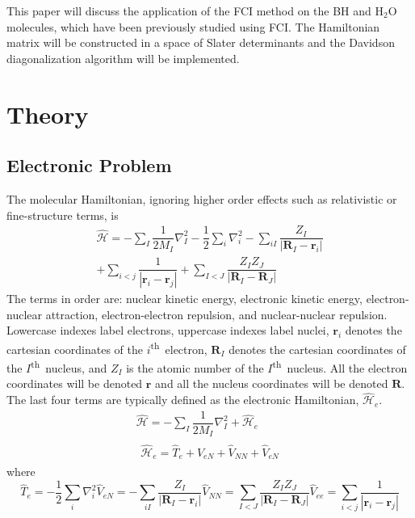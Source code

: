 \documentclass[final,3p,times,twocolumn]{elsarticle}
\newcommand{\ssth}{\textsuperscript{th}}
\newcommand{\ham}{\hat{\mathcal{H}}}
\begin{document}
This paper will discuss the application of the FCI method on the BH and H$_2$O molecules, which have been previously studied using FCI.\cite{handy-1983} The Hamiltonian matrix will be constructed in a space of Slater determinants and the Davidson diagonalization algorithm will be implemented. 

\section{Theory}
\subsection{Electronic Problem} \label{sec:elproblem}
The molecular Hamiltonian, ignoring higher order effects such as relativistic or fine-structure terms, is
\begin{equation}
\begin{gathered}
\hat{\mathcal H} = - \sum_I \dfrac{1}{2M_I} \nabla_I^2 -\dfrac{1}{2} \sum_i \nabla_i^2 - \sum_{iI} \dfrac{Z_I}{|\mathbf{R}_I - \mathbf{r}_i|} \\
+ \sum_{i < j} \dfrac{1}{|\mathbf{r}_i - \mathbf{r}_j|} + \sum_{I < J} \dfrac{Z_IZ_J}{|\mathbf{R}_I - \mathbf{R}_J|}
\end{gathered}
\end{equation}
The terms in order are: nuclear kinetic energy, electronic kinetic energy, electron-nuclear attraction, electron-electron repulsion, and nuclear-nuclear repulsion. Lowercase indexes label electrons, uppercase indexes label nuclei, $\mathbf{r}_i$ denotes the cartesian coordinates of the $i$\ssth\ electron, $\mathbf{R}_I$ denotes the cartesian coordinates of the $I$\ssth\ nucleus, and $Z_I$ is the atomic number of the $I$\ssth\ nucleus. All the electron coordinates will be denoted $\mathbf{r}$ and all the nucleus coordinates will be denoted $\mathbf{R}$. The last four terms are typically defined as the electronic Hamiltonian, $\ham_e$.
\begin{gather}
\hat{\mathcal H} = - \sum_I \dfrac{1}{2M_I} \nabla_I^2 + \ham_e \\
\begin{gathered}\label{eq:hame}
\ham_e = \hat T_e + \hat V_{eN} + \hat V_{NN} + \hat V_{eN}
\end{gathered}
\end{gather}
where
\begin{subequations}
\begin{equation}
\hat T_e = -\dfrac{1}{2} \sum_i \nabla_i^2 
\end{equation}
\begin{equation}
\hat V_{eN} = - \sum_{iI} \dfrac{Z_I}{|\mathbf{R}_I - \mathbf{r}_i|}
\end{equation}
\begin{equation} \label{eq:vnn}
\hat V_{NN} = \sum_{I < J} \dfrac{Z_IZ_J}{|\mathbf{R}_I - \mathbf{R}_J|}
\end{equation}
\begin{equation}
\hat V_{ee} = \sum_{i < j} \dfrac{1}{|\mathbf{r}_i - \mathbf{r}_j|}
\end{equation}
\end{subequations}
\end{document}
